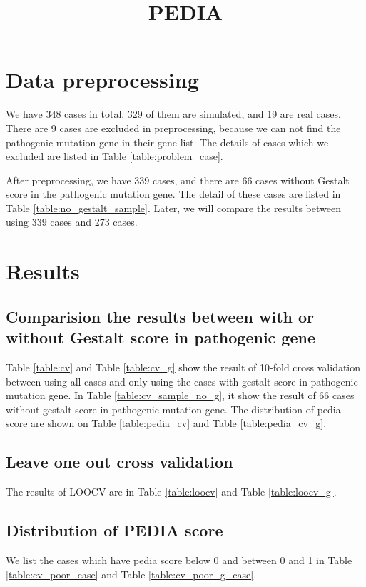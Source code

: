 \documentclass[12pt,cspaper]{paper}
\begin{document}
\title{PEDIA}

\maketitle

\section{Data preprocessing}
We have 348 cases in total. 329 of them are simulated, and 19 are real
cases. There are 9 cases are excluded in preprocessing, because we can
not find the pathogenic mutation gene in their gene list. The
details of cases which we excluded are listed in Table
\ref{table:problem_case}.

After preprocessing, we have 339 cases, and there are 66 cases without Gestalt score in the pathogenic
mutation gene. The detail of these cases are listed in Table
\ref{table:no_gestalt_sample}. Later, we will compare the results
between using 339 cases and 273 cases.



\section{Results}
\subsection{Comparision the results between with or without Gestalt
score in pathogenic gene}
Table \ref{table:cv} and Table \ref{table:cv_g} show the result of
10-fold cross validation between using all cases and only using the
cases with gestalt score in pathogenic mutation gene.
In Table \ref{table:cv_sample_no_g}, it show the result of 66 cases
without gestalt score in pathogenic mutation gene.
The distribution of pedia score are shown on Table \ref{table:pedia_cv}
and Table \ref{table:pedia_cv_g}.





\subsection{Leave one out cross validation}
The results of LOOCV are in Table \ref{table:loocv} and Table
\ref{table:loocv_g}.

\subsection{Distribution of PEDIA score}
We list the cases which have pedia score below 0 and between 0 and 1 in
Table \ref{table:cv_poor_case} and Table \ref{table:cv_poor_g_case}.

%
%
\end{document}
